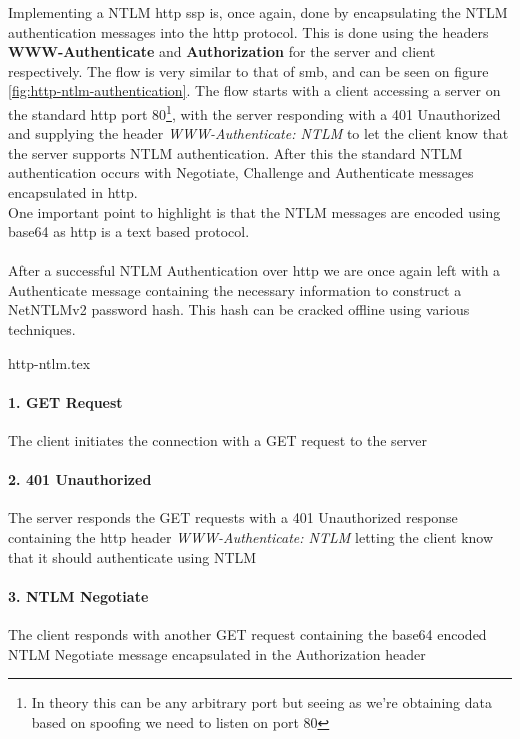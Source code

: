 \documentclass{article}
\begin{document}
\subsubsection{}
Implementing a NTLM \gls{http} \gls{ssp} is, once again, done by encapsulating the NTLM authentication messages into the \gls{http} protocol. This is done using the headers \textbf{WWW-Authenticate} and \textbf{Authorization} for the server and client respectively. The flow is very similar to that of \gls{smb}, and can be seen on figure \ref{fig:http-ntlm-authentication}. The flow starts with a client accessing a server on the standard \gls{http} port 80\footnote{In theory this can be any arbitrary port but seeing as we're obtaining data based on spoofing we need to listen on port 80}, with the server responding with a 401 Unauthorized and supplying the header \emph{WWW-Authenticate: NTLM} to let the client know that the server supports NTLM authentication. After this the standard NTLM authentication occurs with Negotiate, Challenge and Authenticate messages encapsulated in \gls{http}. \\
One important point to highlight is that the NTLM messages are encoded using base64 as \gls{http} is a text based protocol.
\\\\
After a successful NTLM Authentication over \gls{http} we are once again left with a Authenticate message containing the necessary information to construct a NetNTLMv2 password hash. This hash can be cracked offline using various techniques.

{http-ntlm.tex}
\paragraph{1. GET Request} The client initiates the connection with a GET request to the server
\paragraph{2. 401 Unauthorized} The server responds the GET requests with a 401 Unauthorized response containing the \gls{http} header \emph{WWW-Authenticate: NTLM} letting the client know that it should authenticate using NTLM
\paragraph{3. NTLM Negotiate} The client responds with another GET request containing the base64 encoded NTLM Negotiate message encapsulated in the Authorization header
\end{document}

